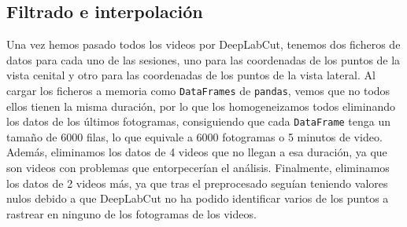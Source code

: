 \subsection{Filtrado e interpolación}
Una vez hemos pasado todos los videos por DeepLabCut, tenemos dos ficheros de datos para cada uno de las sesiones, uno para las coordenadas de los puntos de la vista cenital y otro para las coordenadas de los puntos de la vista lateral. Al cargar los ficheros a memoria como \texttt{DataFrames} de \texttt{pandas}, vemos que no todos ellos tienen la misma duración, por lo que los homogeneizamos todos eliminando los datos de los últimos fotogramas, consiguiendo que cada \texttt{DataFrame} tenga un tamaño de 6000 filas, lo que equivale a 6000 fotogramas o 5 minutos de video. Además, eliminamos los datos de 4 videos que no llegan a esa duración, ya que son videos con problemas que entorpecerían el análisis. Finalmente, eliminamos los datos de 2 videos más, ya que tras el preprocesado seguían teniendo valores nulos debido a que DeepLabCut no ha podido identificar varios de los puntos a rastrear en ninguno de los fotogramas de los videos.


